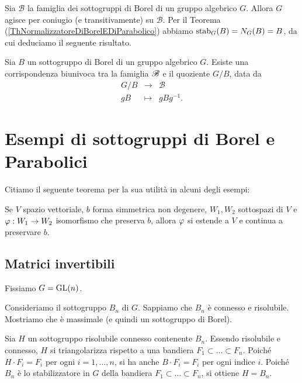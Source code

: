 Sia $\mathscr{B}$ la famiglia dei sottogruppi di Borel di un gruppo algebrico $G$. Allora $G$ agisce per coniugio (e transitivamente) su $\mathscr{B}$. Per il Teorema (\ref{ThNormalizzatoreDiBorelEDiParabolico}) abbiamo $\operatorname{stab}_G(B)=N_G(B)=B$, da cui deduciamo il seguente risultato.
\begin{corollary}
    Sia $B$ un sottogruppo di Borel di un gruppo algebrico $G$. Esiste una corrispondenza biunivoca tra la famiglia $\mathscr{B}$ e il quoziente $G/B$, data da \[\begin{array}{ccc}
        G/B &\longrightarrow& \mathscr{B} \\
         gB & \longmapsto & gBg^{-1}.
    \end{array}\]
\end{corollary}





\section{Esempi di sottogruppi di Borel e Parabolici}
Citiamo il seguente teorema per la sua utilit\`a in alcuni degli esempi:

\begin{theorem}[Witt]\label{ThWitt}
Se $V$ spazio vettoriale, $b$ forma simmetrica non degenere, $W_1,W_2$ sottospazi di $V$ e $\varphi:W_1\to W_2$ isomorfismo che preserva $b$, allora $\varphi$ si estende a $V$ e continua a preservare $b$.
\end{theorem}

\subsection{Matrici invertibili}
Fissiamo $G=\mathrm{GL}(n)$. 
\begin{example}
Consideriamo il sottogruppo $B_n$ di $G$. Sappiamo che $B_n$ è connesso e risolubile. Mostriamo che è massimale (e quindi un sottogruppo di Borel). 

Sia $H$ un sottogruppo risolubile connesso contenente $B_n$. Essendo risolubile e connesso, $H$ si triangolarizza rispetto a una bandiera $F_1\subset \ldots \subset F_n$. Poiché $H\cdot F_i=F_i$ per ogni $i=1,\ldots,n$, si ha anche $B\cdot F_i=F_i$ per ogni indice $i$. Poiché $B_n$ è lo stabilizzatore in $G$ della bandiera $F_1\subset \ldots \subset F_n$, si ottiene $H=B_n$. 
\end{example}

